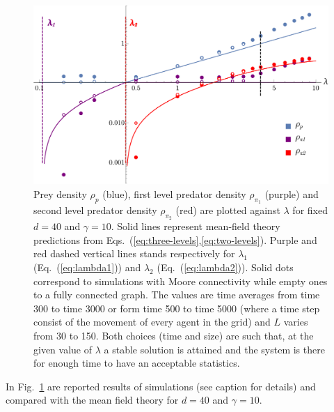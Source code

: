 \documentclass[10pt]{article}
\begin{document}
\begin{center}
\begin{figure}[h]
\includegraphics[width=1\linewidth]{sim2.pdf}
\caption{Prey density $\rho_p$ (blue), first level predator density $\rho_{\pi_1}$ (purple) and second level
predator density $\rho_{\pi_2}$ (red) are plotted against $\lambda$ for fixed $d=40$ and $\gamma=10$.
Solid lines represent mean-field theory predictions from Eqs.~(\ref{eq:three-levels},\ref{eq:two-levels}).
Purple and red dashed vertical lines stands respectively for $\lambda_1$ (Eq.~(\ref{eq:lambda1})) and $\lambda_2$
(Eq.~(\ref{eq:lambda2})). Solid dots correspond to simulations with Moore connectivity while empty ones
to a fully connected graph. The values are time averages from time 300 to time 3000 or form time 500 to time 5000
(where a time step consist of the movement of every agent in the grid) and $L$ varies from 30 to 150.
Both choices (time and size) are such that, at the given value of $\lambda$
a stable solution is attained and the system is there for enough time to have an acceptable statistics.}
\label{pic:simulations}
\end{figure}
\end{center}
In Fig.~\ref{pic:simulations} are reported results of simulations (see caption for details) and compared with
the mean field theory for $d=40$ and $\gamma=10$.
\end{document}

